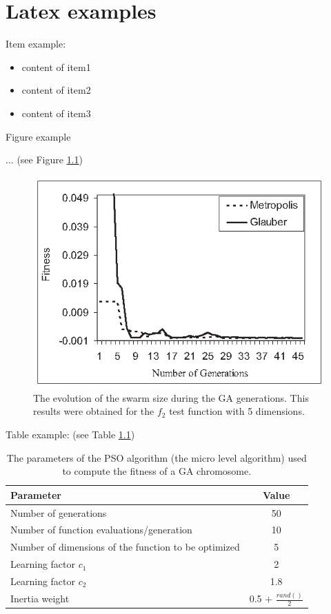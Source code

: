 \documentclass[runningheads,a4paper,11pt]{report}
\begin{document}
\chapter{Latex examples}

Item example: 

\begin{itemize}
	\item content of item1
 	\item content of item2
 	\item content of item3
\end{itemize}



Figure example 

$\ldots$ (see Figure \ref{swarmsize})

\begin{figure}[htbp]
	\centerline{\includegraphics{Fig/FitEvol.eps}}  
	\caption{The evolution of the swarm size during the GA generations. This results were obtained for the $f_2$ test function with 5 dimensions.}
	\label{swarmsize}
\end{figure}


Table example: (see Table \ref{tab3PSO})


\begin{table}[htbp]
	\caption{The parameters of the PSO algorithm (the micro level algorithm) used to compute the fitness of a GA chromosome.}
	\label{tab3PSO}
		\begin{center}
			\begin{tabular}{p{220pt}c}

				\textbf{Parameter}& \textbf{Value} \\
				\hline\hline
 				Number of generations& 50 \\
 				Number of function evaluations/generation& 10 \\
 				Number of dimensions of the function to be optimized& 5 \\
 				Learning factor $c_{1}$& 2 \\
 				Learning factor $c_{2}$ & 1.8\\
 				Inertia weight& 0.5 + $\frac{rand()}{2}$\\
		
			\end{tabular}
		\end{center}
\end{table}
\end{document}
